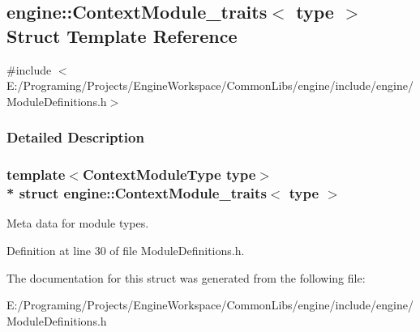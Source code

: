 \hypertarget{a00014}{}\subsection{engine\+:\+:Context\+Module\+\_\+traits$<$ type $>$ Struct Template Reference}
\label{a00014}


{\ttfamily \#include $<$E\+:/\+Programing/\+Projects/\+Engine\+Workspace/\+Common\+Libs/engine/include/engine/\+Module\+Definitions.\+h$>$}



\subsubsection{Detailed Description}
\subsubsection*{template$<$Context\+Module\+Type type$>$\\*
struct engine\+::\+Context\+Module\+\_\+traits$<$ type $>$}

Meta data for module types. 

Definition at line 30 of file Module\+Definitions.\+h.



The documentation for this struct was generated from the following file\+:\begin{DoxyCompactItemize}
\item 
E\+:/\+Programing/\+Projects/\+Engine\+Workspace/\+Common\+Libs/engine/include/engine/Module\+Definitions.\+h\end{DoxyCompactItemize}
